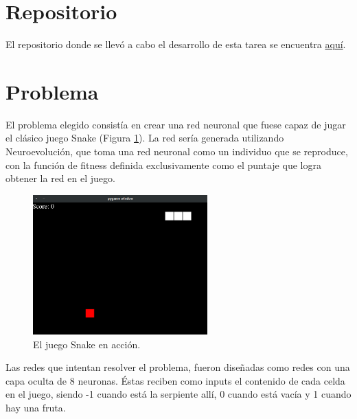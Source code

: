 \documentclass[letterpaper,11pt]{article} %
\begin{document}







\section*{Repositorio}
  El repositorio donde se llevó a cabo el desarrollo de esta tarea se encuentra \href{https://github.com/danno-s/neuroevolution}{aquí}.

\section{Problema}
  El problema elegido consistía en crear una red neuronal que fuese capaz de jugar el clásico juego Snake (Figura \ref{snakegame}). La red sería generada utilizando Neuroevolución, que toma una red neuronal como un individuo que se reproduce, con la función de fitness definida exclusivamente como el puntaje que logra obtener la red en el juego.

  \begin{figure}
    \centering
    \includegraphics[width=0.6\textwidth]{images/snake.png}
    \caption{El juego Snake en acción.}
    \label{snakegame}
  \end{figure}

  Las redes que intentan resolver el problema, fueron diseñadas como redes con una capa oculta de 8 neuronas. Éstas reciben como inputs el contenido de cada celda en el juego, siendo -1 cuando está la serpiente allí, 0 cuando está vacía y 1 cuando hay una fruta.
\end{document}
